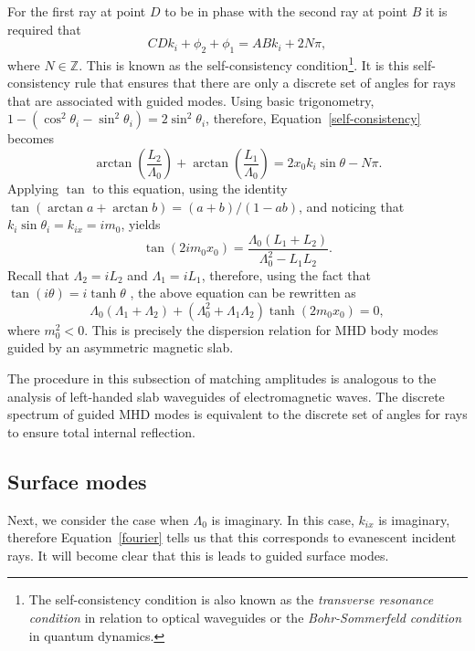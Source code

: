 	For the first ray at point $D$ to be in phase with the second ray at point $B$ it is required that
	\begin{equation}
	CD k_i  + \phi_2 + \phi_1 = AB k_i + 2N\pi, \label{self-consistency}
	\end{equation}
	where $N \in \mathbb{Z}$.
	This is known as the self-consistency condition\footnote{The self-consistency condition is also known as the \textit{transverse resonance condition} in relation to optical waveguides \citep{sym_etal92} or the \textit{Bohr-Sommerfeld condition} in quantum dynamics.}. It is this self-consistency rule that ensures that there are only a discrete set of angles for rays that are associated with guided modes. Using basic trigonometry, $1 - (\cos^2{\theta_i} - \sin^2{\theta_i}) = 2\sin^2{\theta_i}$, therefore, Equation~\eqref{self-consistency} becomes
	\begin{equation}
	\arctan\left(\frac{L_2}{\Lambda_0}\right) + \arctan\left(\frac{L_1}{\Lambda_0}\right) = 2x_0k_i \sin{\theta} - N\pi.
	\end{equation}
	Applying $\tan$ to this equation, using the identity $\tan(\arctan{a} + \arctan{b}) = (a + b) / (1 - ab)$, and noticing that $k_i\sin{\theta_i} = k_{ix} = im_0$, yields
	\begin{equation}
	\tan(2im_0x_0) = \frac{\Lambda_0 (L_1 + L_2)}{\Lambda_0^2 - L_1L_2}.
	\end{equation}
	Recall that $\Lambda_2 = iL_2$ and $\Lambda_1 = iL_1$, therefore, using the fact that $\tan(i\theta) = i\tanh{\theta}$ \citep{abr_etal65}, the above equation can be rewritten as
	\begin{equation}
	\Lambda_0 (\Lambda_1 + \Lambda_2) + (\Lambda_0^2 + \Lambda_1\Lambda_2)\tanh(2m_0x_0) = 0, \label{DR}
	\end{equation}
	where $m_0^2 < 0$. This is precisely the dispersion relation for MHD body modes guided by an asymmetric magnetic slab.
	
	The procedure in this subsection of matching amplitudes is analogous to the analysis of left-handed slab waveguides of electromagnetic waves. The discrete spectrum of guided MHD modes is equivalent to the discrete set of angles for rays to ensure total internal reflection.
	
	
	\subsection{Surface modes}
	Next, we consider the case when $\Lambda_0$ is imaginary. In this case, $k_{ix}$ is imaginary, therefore Equation~\eqref{fourier} tells us that this corresponds to evanescent incident rays. It will become clear that this is leads to guided surface modes.
	
